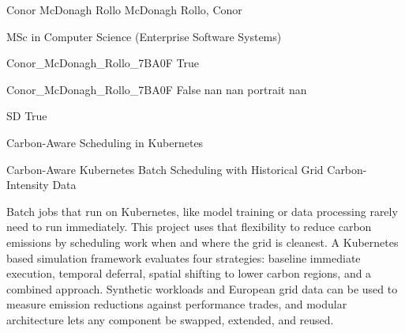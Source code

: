 \documentclass[twoside]{report}
\begin{document}
\begingroup{}\relax



\def\Key{Conor_McDonagh_Rollo_7BA0F}

{Conor McDonagh Rollo}
{McDonagh Rollo, Conor}

{MSc in Computer Science (Enterprise Software Systems)}

{Conor_McDonagh_Rollo_7BA0F}
{True}

{Conor_McDonagh_Rollo_7BA0F}
{False}
{nan}
{nan}
{portrait}
{nan}

{SD}
{True}

{Carbon-Aware Scheduling in Kubernetes}

{Carbon-Aware Kubernetes Batch Scheduling with Historical Grid Carbon-Intensity Data}

{Batch jobs that run on Kubernetes, like model training or data processing rarely need to run immediately. This project uses that flexibility to reduce carbon emissions by scheduling work when and where the grid is cleanest. A Kubernetes based simulation framework evaluates four strategies: baseline immediate execution, temporal deferral, spatial shifting to lower carbon regions, and a combined approach. Synthetic workloads and European grid data can be used to measure emission reductions against performance trades, and modular architecture lets any component be swapped, extended, and reused.}
\end{document}
